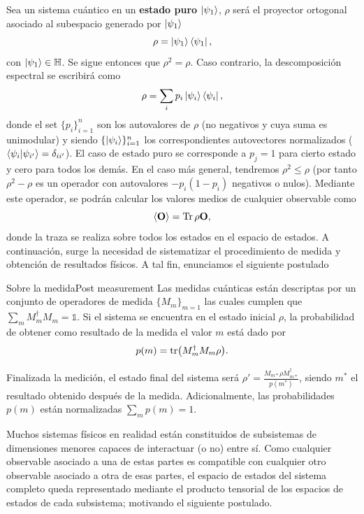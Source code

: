\documentclass{report} %
\numberwithin{equation}{section}
\begin{document}
Sea un sistema cuántico en un \textbf{estado puro} $\ket{\psi_1}$, $\rho$ será el proyector ortogonal asociado al subespacio generado por $\ket{\psi_1}$
\begin{equation}
    \rho = \ket{\psi_1}\bra{\psi_1},
\end{equation}
con $\ket{\psi_1} \in \mathbb{H}$. Se sigue entonces que $\rho^2 = \rho$. Caso contrario, la descomposición espectral se escribirá como
\begin{equation}
    \rho = \sum_{i}p_i \ket{\psi_i}\bra{\psi_i}, 
    \label{spectral_decomp}
\end{equation}
donde el set $\{p_i\}_{i=1}^{n}$ son los autovalores de $\rho$ (no negativos y cuya suma es unimodular) y siendo $\{\ket{\psi_i}\}_{i=1}^{n}$ los correspondientes autovectores normalizados ($\bra{\psi_i}\ket{\psi_{i'}} = \delta_{ii'}$). El caso de estado puro se corresponde a $p_j = 1$ para cierto estado y cero para todos los demás. En el caso más general, tendremos $\rho^2 \leq \rho$ (por tanto $\rho^2 - \rho$ es un operador con autovalores $-p_i (1-p_i)$ negativos o nulos).
Mediante este operador, se podrán calcular los valores medios de cualquier observable como 
\begin{equation}
    \langle \mathbf{O} \rangle = \Tr \rho \mathbf{O},
\end{equation}
donde la traza se realiza sobre todos los estados en el espacio de estados. A continuación, surge la necesidad de sistematizar el procedimiento de medida y obtención de resultados físicos. A tal fin, enunciamos el siguiente postulado

\begin{post}{Sobre la medida}{Post 
measurement} 
\label{Post measurement}
Las medidas cuánticas están descriptas por un conjunto de operadores de medida $\{M_m\}_{m=1}$ las cuales cumplen que $\sum_{m} M_m^{\dagger}M_m = \mathds{1}$. Si el sistema se encuentra en el estado inicial $\rho$, la probabilidad de obtener como resultado de la medida el valor $m$ está dado por 
\begin{equation}
    p(m) = \tr (M_m^{\dagger}M_m \rho).
\end{equation}

Finalizada la medición, el estado final del sistema será  $\rho' = \frac{M_{m*} \rho M_{m*}^{\dagger}}{p(m^{*})}$, siendo $m^*$ el resultado obtenido después de la medida. Adicionalmente, las probabilidades $p(m)$ están normalizadas $\sum_m p(m) = 1$.
\end{post}

Muchos sistemas físicos en realidad están constituidos de subsistemas de dimensiones menores capaces de interactuar (o no) entre sí. Como cualquier observable asociado a una de estas partes es compatible con cualquier otro observable asociado a otra de esas partes, el espacio de estados del sistema completo queda representado mediante el producto tensorial de los espacios de estados de cada subsistema; motivando el siguiente postulado.
\end{document}
